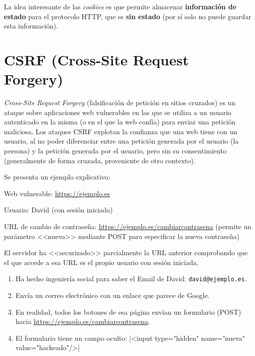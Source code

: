 La idea interesante de las \textit{cookies} es que permite almacenar
\textbf{información de estado} para el protocolo HTTP, que es \textbf{sin
estado} (por sí solo no puede guardar esta información).

\section{CSRF (Cross-Site Request Forgery)}
\emph{Cross-Site Request Forgery} (falsificación de petición en sitios cruzados)
es un ataque sobre aplicaciones web vulnerables en las que se utiliza a un
usuario autenticado en la misma (o en el que la web confía) para enviar una
petición maliciosa. Los ataques CSRF explotan la confianza que una web tiene con
un usuario, al no poder diferenciar entre una petición generada por el usuario
(la persona) y la petición generada por el usuario, pero sin su consentimiento
\cite{csrf} (generalmente de forma cruzada, proveniente de otro contexto).

Se presenta un ejemplo explicativo:

\begin{tcolorbox}[colback=cyan!5!white,colframe=cyan!75!black,title=Situación]
Web vulnerable: \url{https://ejemplo.es}

Usuario: David (con sesión iniciada)

URL de cambio de contraseña: \url{https://ejemplo.es/cambiarcontrasena} (permite
un parámetro <<nueva>> mediante POST para especificar la nueva contraseña)

El servidor ha <<securizado>> parcialmente la URL anterior comprobando que el
que accede a esa URL es el propio usuario con sesión iniciada.
\end{tcolorbox}


\begin{tcolorbox}[colback=red!5!white,colframe=red!75!black,title=Atacante]
    \begin{enumerate}
        \item Ha hecho ingeniería social para saber el Email de David:
        \mbox{\texttt{david@ejemplo.es}}.
        \item Envía un correo electrónico con un enlace que parece de Google.
        \item En realidad, todos los botones de esa página envían un formulario (POST)
        hacia \url{https://ejemplo.es/cambiarcontrasena}.
        \item El formulario tiene un campo oculto:
        |<input type="hidden" name="nueva" value="hackeado"/>|
    \end{enumerate}
\end{tcolorbox}

